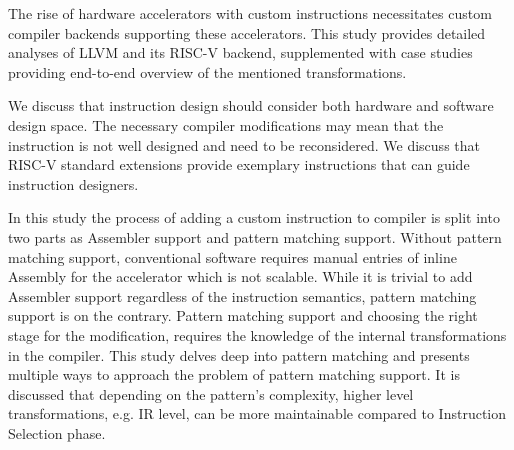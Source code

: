 
The rise of hardware accelerators with custom instructions necessitates custom compiler backends supporting these accelerators. This study provides detailed analyses of LLVM and its RISC-V backend, supplemented with case studies providing end-to-end overview of the mentioned transformations. 

We discuss that instruction design should consider both hardware and software design space. The necessary compiler modifications may mean that the instruction is not well designed and need to be reconsidered. We discuss that RISC-V standard extensions provide exemplary instructions that can guide instruction designers.

In this study the process of adding a custom instruction to compiler is split into two parts as Assembler support and pattern matching support. Without pattern matching support, conventional software requires manual entries of inline Assembly for the accelerator which is not scalable. While it is trivial to add Assembler support regardless of the instruction semantics, pattern matching support is on the contrary. Pattern matching support and choosing the right stage for the modification, requires the knowledge of the internal transformations in the compiler. This study delves deep into pattern matching and presents multiple ways to approach the problem of pattern matching support. It is discussed that depending on the pattern's complexity, higher level transformations, e.g. IR level, can be more maintainable compared to Instruction Selection phase. 







